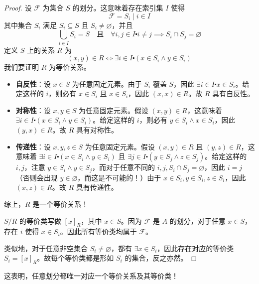 \begin{proof}
    设 $\mathcal{F}$ 为集合 $S$ 的划分。这意味着存在索引集 $I$ 使得
    \[\mathcal{F} = {S_i \mid i \in I}\]
    其中集合 $S_i$ 满足 $S_i \subseteq S$ 且 $S_i \ne \varnothing$，并且
    \[\bigcup_{i \in I} S_i = S \quad \text{且} \quad \forall i, j \in I \centerdot i \ne j \implies S_i \cap S_j = \varnothing\]
    定义 $S$ 上的关系 $R$ 为
    \[(x, y) \in R \iff \exists i \in I \centerdot (x \in S_i \land y \in S_i)\]
    我们要证明 $R$ 为等价关系。

    \begin{itemize}
        \item \textbf{自反性}：设 $x \in S$ 为任意固定元素。由于 $S_i$ 覆盖 $S$，因此 $\exists i \in I \centerdot x \in S_i$。给定这样的 $i$，则必有 $x \in S_i$ 且 $x \in S_i$，因此 $(x,x) \in R$。故 $R$ 具有自反性。
        
        \item \textbf{对称性}：设 $x, y \in S$ 为任意固定元素。假设 $(x, y) \in R$，这意味着 $\exists i \in I \centerdot (x \in S_i \land y \in S_i)$。给定这样的 $i$，则必有 $y \in S_i \land x \in S_i$，因此 $(y,x) \in R$。故 $R$ 具有对称性。
        
        \item \textbf{传递性}：设 $x, y, z \in S$ 为任意固定元素。假设 $(x, y) \in R$ 且 $(y, z) \in R$，这意味着 $\exists i \in I \centerdot (x \in S_i \land y \in S_i)$ 且 $\exists j \in I \centerdot (y \in S_j \land z \in S_j)$。给定这样的 $i, j$，注意 $y \in S_i \land y \in S_j$，而对于任意不同的 $i,j, S_i \cap S_j = \varnothing$，因此 $i=j$（否则会出现 $y \in \varnothing$，而这是不可能的！）由于 $x \in S_i, y \in S_i, z \in S_i$，因此 $(x,z) \in R$。故 $R$ 具有传递性。
    \end{itemize}
    综上，$R$ 是一个等价关系！

    $S/R$ 的等价类写做 $[x]_R$，其中 $x \in S$。因为 $\mathcal{F}$ 是 $A$ 的划分，对于任意 $x \in S$，存在 $i$ 使得 $x \in S_i$。因此所有等价类均属于 $\mathcal{F}$。

    类似地，对于任意非空集合 $S_i \ne \varnothing$，都有 $\exists x \in S_i$，因此存在对应的等价类 $S_i=[x]_R$。故每个等价类都是形如 $S_i$ 的集合，反之亦然。
\end{proof}

这表明，任意划分都唯一对应一个等价关系及其等价类！
